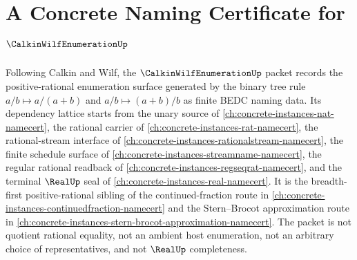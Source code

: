 \chapter{A Concrete Naming Certificate for $\CalkinWilfEnumerationUp$}
\label{ch:concrete-instances-calkin-wilf-enumeration-namecert}

Following Calkin and Wilf, the $\CalkinWilfEnumerationUp$ packet records the
positive-rational enumeration surface generated by the binary tree rule
$a/b \mapsto a/(a+b)$ and $a/b \mapsto (a+b)/b$ as finite BEDC naming data.
Its dependency lattice starts from the unary source of
\autoref{ch:concrete-instances-nat-namecert}, the rational carrier of
\autoref{ch:concrete-instances-rat-namecert}, the rational-stream interface of
\autoref{ch:concrete-instances-rationalstream-namecert}, the finite schedule
surface of \autoref{ch:concrete-instances-streamname-namecert}, the regular
rational readback of \autoref{ch:concrete-instances-regseqrat-namecert}, and
the terminal $\RealUp$ seal of \autoref{ch:concrete-instances-real-namecert}.
It is the breadth-first positive-rational sibling of the continued-fraction
route in \autoref{ch:concrete-instances-continuedfraction-namecert} and the
Stern--Brocot approximation route in
\autoref{ch:concrete-instances-stern-brocot-approximation-namecert}. The
packet is not quotient rational equality, not an ambient host enumeration, not
an arbitrary choice of representatives, and not $\RealUp$ completeness.

